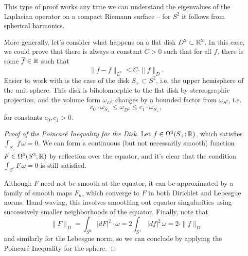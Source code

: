\documentclass{lkx_paper}
\begin{document}
This type of proof works any time we can understand the eigenvalues of the Laplacian operator on a compact Riemann surface -- for $S^2$ it follows from spherical harmonics.

More generally, let's consider what happens on a flat disk $D^2\subset \mathbb{R}^2$. In this case, we could prove that there is always a constant $C>0$ such that for all $f$, there is some $\overline{f}\in \mathbb{R}$ such that
\[
	\|f-\overline{f}\|_{L^2} \leq C\cdot \|f\|_D.
\]
Easier to work with is the case of the disk $S_+ \subset S^2$, i.e. the upper hemisphere of the unit sphere. This disk is biholomorphic to the flat disk by stereographic projection, and the volume form $\omega_{D^2}$ changes by a bounded factor from $\omega_{S^2}$, i.e.
\[
	c_0\cdot \omega_{S_+} \leq \omega_{D^2}\leq c_1\cdot \omega_{S_+},
\]
for constants $c_0, c_1>0$.

\begin{proof}[Proof of the Poincar\'e Inequality for the Disk]
	Let $f \in \Omega^0(S_+; \mathbb{R})$, which satisfies $\int_{S_+} f\,\omega = 0$. We can form a continuous (but not necessarily smooth) function $F \in \Omega^0(S^2; \mathbb{R})$ by reflection over the equator, and it's clear that the condition $\int_{S^2} F\,\omega=0$ is still satisfied.

	Although $F$ need not be smooth at the equator, it can be approximated by a family of smooth maps $F_n$, which converge to $F$ in both Dirichlet and Lebesgue norms. Hand-waving, this involves smoothing out equator singularities using successively smaller neighborhoods of the equator. Finally, note that
	\[
		\|F\|_D = \int_{S^2} |dF|^2\cdot \omega = 2\int_{S^+} |df|^2\,\omega = 2\cdot \|f\|_D
	\]
	and similarly for the Lebesgue norm, so we can conclude by applying the Poincar\'e Inequality for the sphere.
\end{proof}
\end{document}
